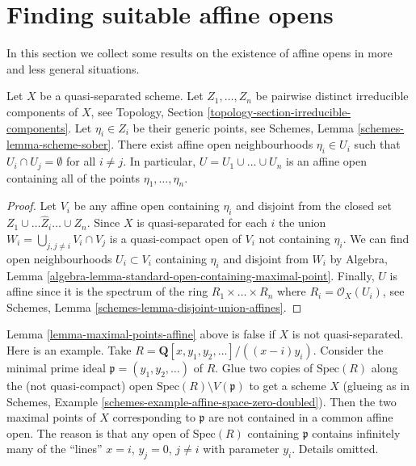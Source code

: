 \section{Finding suitable affine opens}
\label{section-finding-affine-opens}

\noindent
In this section we collect some results on the existence of
affine opens in more and less general situations.

\begin{lemma}
\label{lemma-maximal-points-affine}
Let $X$ be a quasi-separated scheme.
Let $Z_1, \ldots, Z_n$ be pairwise distinct irreducible components of $X$,
see Topology, Section \ref{topology-section-irreducible-components}.
Let $\eta_i \in Z_i$ be their generic points, see
Schemes, Lemma \ref{schemes-lemma-scheme-sober}.
There exist affine open neighbourhoods $\eta_i \in U_i$
such that $U_i \cap U_j = \emptyset$ for all $i \not = j$.
In particular, $U = U_1 \cup \ldots \cup U_n$ is an affine
open containing all of the points $\eta_1, \ldots, \eta_n$.
\end{lemma}

\begin{proof}
Let $V_i$ be any affine open containing $\eta_i$
and disjoint from the closed set $Z_1 \cup \ldots \hat Z_i \ldots \cup Z_n$.
Since $X$ is quasi-separated for each $i$ the union
$W_i = \bigcup_{j, j \not = i} V_i \cap V_j$ is a quasi-compact
open of $V_i$ not containing $\eta_i$.
We can find open neighbourhoods $U_i \subset V_i$
containing $\eta_i$ and disjoint from $W_i$ by
Algebra, Lemma \ref{algebra-lemma-standard-open-containing-maximal-point}.
Finally, $U$ is affine since it is the spectrum of
the ring $R_1 \times \ldots \times R_n$ where $R_i = \mathcal{O}_X(U_i)$,
see Schemes, Lemma \ref{schemes-lemma-disjoint-union-affines}.
\end{proof}

\begin{remark}
\label{remark-maximal-points-affine}
Lemma \ref{lemma-maximal-points-affine} above is false if $X$
is not quasi-separated. Here is an example. Take
$R = \mathbf{Q}[x, y_1, y_2, \ldots]/((x-i)y_i)$.
Consider the minimal prime ideal $\mathfrak p = (y_1, y_2, \ldots)$
of $R$. Glue two copies of $\text{Spec}(R)$ along the
(not quasi-compact) open $\text{Spec}(R) \setminus V(\mathfrak p)$
to get a scheme $X$ (glueing as in
Schemes, Example \ref{schemes-example-affine-space-zero-doubled}).
Then the two maximal points of $X$ corresponding to $\mathfrak p$
are not contained in a common affine open. The reason is
that any open of $\text{Spec}(R)$ containing $\mathfrak p$
contains infinitely many of the ``lines'' $x = i$, $y_j = 0$,
$j \not = i$ with parameter $y_i$. Details omitted.
\end{remark}

